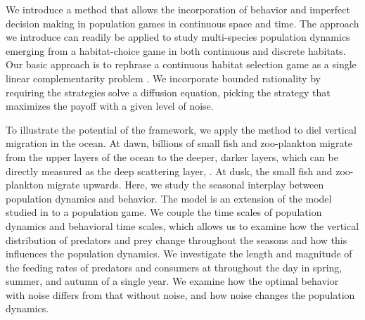 We introduce a method that allows the incorporation of behavior and imperfect decision making in population games in continuous space and time. The approach we introduce can readily be applied to study multi-species population dynamics emerging from a habitat-choice game in both continuous and discrete habitats.  Our basic approach is to rephrase a continuous habitat selection game as a single linear complementarity problem \citep{miller1991copositive}. We incorporate bounded rationality by requiring the strategies solve a diffusion equation, picking the strategy that maximizes the payoff with a given level of noise.


To illustrate the potential of the framework, we apply the method to diel vertical migration in the ocean. At dawn, billions of small fish and zoo-plankton migrate from the upper layers of the ocean to the deeper, darker layers, which can be directly measured as the deep scattering layer, \citep{sutton2013vertical, wang2014seasonal}. At dusk, the small fish and zoo-plankton migrate upwards. Here, we study the seasonal interplay between population dynamics and behavior. The model is an extension of the model studied in \citep{verticalmigration} to a population game. We couple the time scales of population dynamics and behavioral time scales, which allows us to examine how the vertical distribution of predators and prey change throughout the seasons and how this influences the population dynamics. We investigate the length and magnitude of the feeding rates of predators and consumers at throughout the day in spring, summer, and autumn of a single year. We examine how the optimal behavior with noise differs from that without noise, and how noise changes the population dynamics.


